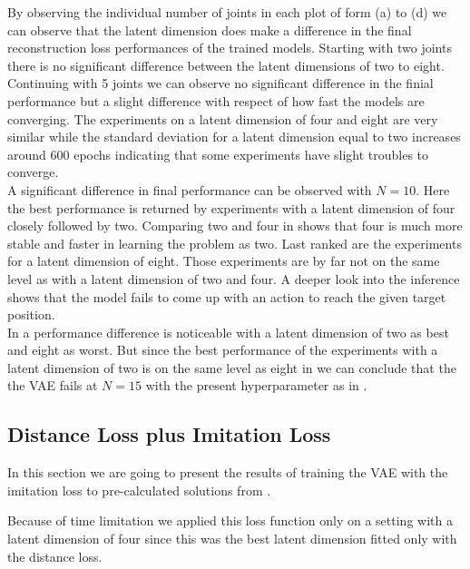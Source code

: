 By observing the individual number of joints in each plot of  form (a) to (d) we can observe that the latent dimension does make a difference in the final reconstruction loss performances of the trained models. Starting with two joints there is no significant difference between the latent dimensions of two to eight. Continuing with 5 joints we can observe no significant difference in the finial performance but a slight difference with respect of how fast the models are converging. The experiments on a latent dimension of four and eight are very similar while the standard deviation for a latent dimension equal to two increases around 600 epochs indicating that some experiments have slight troubles to converge. \\
A significant difference in final performance can be observed with $N = 10$. Here the best performance is returned by experiments with a latent dimension of four closely followed by two. Comparing two and four in  shows that four is much more stable and faster in learning the problem as two. Last ranked are the experiments for a latent dimension of eight. Those experiments are by far not on the same level as with a latent dimension of two and four. A deeper look into the inference shows that the model fails to come up with an action to reach the given target position.\\
In  a performance difference is noticeable with a latent dimension of two as best and eight as worst. But since the best performance of the experiments with a latent dimension of two is on the same level as eight in  we can conclude that the the VAE fails at $N = 15$ with the present hyperparameter as in .

\subsection{Distance Loss plus Imitation Loss}

In this section we are going to present the results of training the VAE with the imitation loss to pre-calculated solutions from . 

Because of time limitation we applied this loss function only on a setting with a latent dimension of four since this was the best latent dimension fitted only with the distance loss. 

